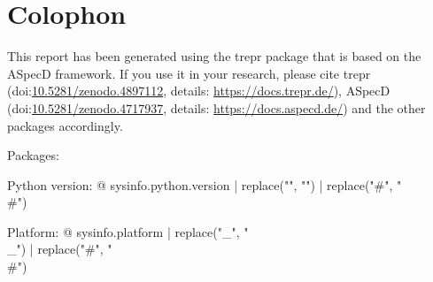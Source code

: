 \section*{Colophon}

This report has been generated using the trepr package that is based on the ASpecD framework. If you use it in your research, please cite trepr (doi:\href{https://doi.org/10.5281/zenodo.4897112}{10.5281/zenodo.4897112}, details: \url{https://docs.trepr.de/}), ASpecD (doi:\href{https://doi.org/10.5281/zenodo.4717937}{10.5281/zenodo.4717937}, details: \url{https://docs.aspecd.de/}) and the other packages accordingly.

Packages: %


Python version: {@ sysinfo.python.version | replace("\n", "") | replace("#", "\\#") }

Platform: {@ sysinfo.platform | replace("_", "\\_") | replace("#", "\\#") }
